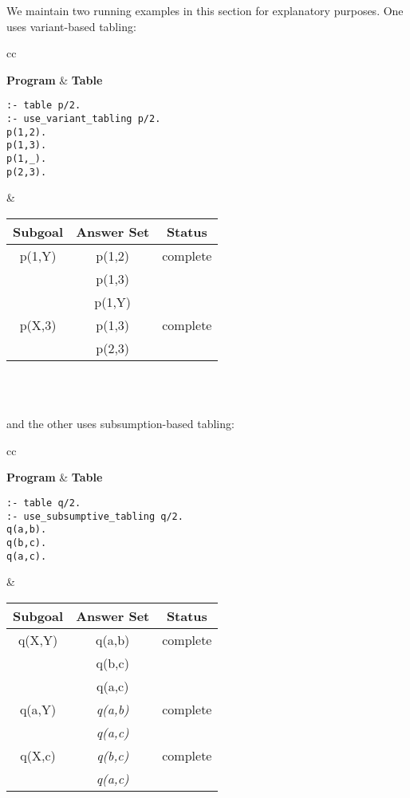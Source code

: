 We maintain two running examples in this section for explanatory
purposes.  One uses variant-based tabling:
%
\begin{center}
\begin{tabular}{cc}\hline \hline
{} \\ \hline \hline
\rule[-2ex]{0ex}{5ex} \textbf{Program} & \textbf{Table} \\
\begin{minipage}{14.5em}
\begin{verbatim}
:- table p/2.
:- use_variant_tabling p/2.
p(1,2).
p(1,3).
p(1,_).
p(2,3).
\end{verbatim}
\end{minipage}
&
\begin{tabular}{|c|c|c|} \hline
  Subgoal & Answer Set & Status\\ \hline \hline
  p(1,Y) & p(1,2) & complete \\ 
	 & p(1,3) & \\
	 & p(1,Y) & \\ \hline
  p(X,3) & p(1,3) & complete \\ 
	 & p(2,3) & \\ \hline
\end{tabular} \\
\vspace*{-2ex} \\ \hline \hline
\end{tabular}
\end{center}

\noindent
and the other uses subsumption-based tabling:

\begin{center}
\begin{tabular}{cc}\hline \hline
{} \\ \hline \hline
\rule[-2ex]{0ex}{5ex} \textbf{Program} & \textbf{Table} \\
\begin{minipage}{17em}
\begin{verbatim}
:- table q/2.
:- use_subsumptive_tabling q/2.
q(a,b).
q(b,c).
q(a,c).
\end{verbatim}
\end{minipage}
&
\begin{tabular}{|c|c|c|} \hline
  Subgoal & Answer Set & Status \\ \hline \hline
  q(X,Y) & q(a,b) & complete \\
	 & q(b,c) & \\
	 & q(a,c) & \\ \hline
  q(a,Y) & \textit{q(a,b)} & complete \\
	 & \textit{q(a,c)} & \\ \hline
  q(X,c) & \textit{q(b,c)} & complete \\
	 & \textit{q(a,c)} & \\ \hline
\end{tabular} \\
\vspace*{-2ex} \\ \hline \hline
\end{tabular}
\end{center}

